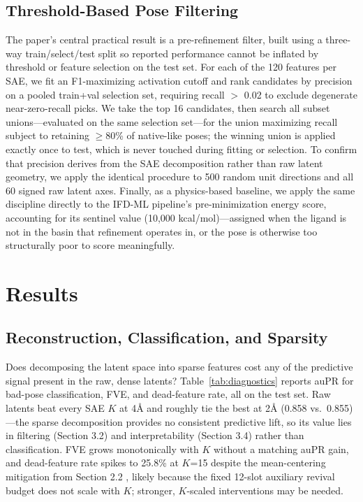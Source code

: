 \documentclass{article}
\begin{document}
\subsection{Threshold-Based Pose Filtering}
The paper's central practical result is a pre-refinement filter, built using a three-way train/select/test split so reported performance cannot be inflated by threshold or feature selection on the test set. For each of the 120 features per SAE, we fit an F1-maximizing activation cutoff and rank candidates by precision on a pooled train+val selection set, requiring recall $>$ 0.02 to exclude degenerate near-zero-recall picks. We take the top 16 candidates, then search all subset unions---evaluated on the same selection set---for the union maximizing recall subject to retaining $\ge$80\% of native-like poses; the winning union is applied exactly once to test, which is never touched during fitting or selection. To confirm that precision derives from the SAE decomposition rather than raw latent geometry, we apply the identical procedure to 500 random unit directions and all 60 signed raw latent axes. Finally, as a physics-based baseline, we apply the same discipline directly to the IFD-ML pipeline's pre-minimization energy score, accounting for its sentinel value (10,000 kcal/mol)---assigned when the ligand is not in the basin that refinement operates in, or the pose is otherwise too structurally poor to score meaningfully.

\section{Results}

\subsection{Reconstruction, Classification, and Sparsity}

Does decomposing the latent space into sparse features cost any of the predictive signal present in the raw, dense latents? Table~\ref{tab:diagnostics} reports auPR for bad-pose classification, FVE, and dead-feature rate, all on the test set. Raw latents beat every SAE $K$ at 4Å and roughly tie the best at 2Å (0.858 vs.\ 0.855)---the sparse decomposition provides no consistent predictive lift, so its value lies in filtering (Section 3.2) and interpretability (Section 3.4) rather than classification. FVE grows monotonically with $K$ without a matching auPR gain, and dead-feature rate spikes to 25.8\% at $K$=15 despite the mean-centering mitigation from Section 2.2 \citep{simon2026}, likely because the fixed 12-slot auxiliary revival budget does not scale with $K$; stronger, $K$-scaled interventions may be needed.
\end{document}
